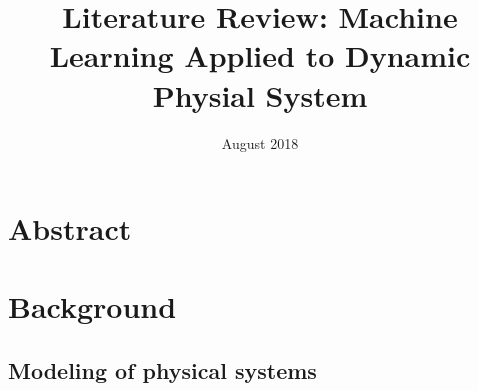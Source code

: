 \documentclass[conference]{IEEEtran}
\begin{document}
\title{Literature Review: Machine Learning Applied to Dynamic Physial System}
\date{August 2018}

\maketitle

\section{Abstract}

\section{Background}
\subsection{Modeling of physical systems}
\end{document}

